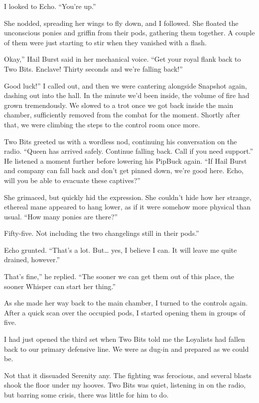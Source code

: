 I looked to Echo. “You’re up.”

She nodded, spreading her wings to fly down, and I followed. She floated the unconscious ponies and griffin from their pods, gathering them together. A couple of them were just starting to stir when they vanished with a flash.

\leavevmode{}Okay,” Hail Burst said in her mechanical voice. “Get your royal flank back to Two Bits. Enclave! Thirty seconds and we’re falling back!”

\leavevmode{}Good luck!” I called out, and then we were cantering alongside Snapshot again, dashing out into the hall. In the minute we’d been inside, the volume of fire had grown tremendously. We slowed to a trot once we got back inside the main chamber, sufficiently removed from the combat for the moment. Shortly after that, we were climbing the steps to the control room once more.

Two Bits greeted us with a wordless nod, continuing his conversation on the radio. “Queen has arrived safely. Continue falling back. Call if you need support.” He listened a moment further before lowering his PipBuck again. “If Hail Burst and company can fall back and don’t get pinned down, we’re good here. Echo, will you be able to evacuate these captives?”

She grimaced, but quickly hid the expression. She couldn’t hide how her strange, ethereal mane appeared to hang lower, as if it were somehow more physical than usual. “How many ponies are there?”

\leavevmode{}Fifty-five. Not including the two changelings still in their pods.”

Echo grunted. “That’s a lot. But… yes, I believe I can. It will leave me quite drained, however.”

\leavevmode{}That’s fine,” he replied. “The sooner we can get them out of this place, the sooner Whisper can start her thing.”

As she made her way back to the main chamber, I turned to the controls again. After a quick scan over the occupied pods, I started opening them in groups of five.

I had just opened the third set when Two Bits told me the Loyalists had fallen back to our primary defensive line. We were as dug-in and prepared as we could be.

Not that it dissuaded Serenity any. The fighting was ferocious, and several blasts shook the floor under my hooves. Two Bits was quiet, listening in on the radio, but barring some crisis, there was little for him to do.

